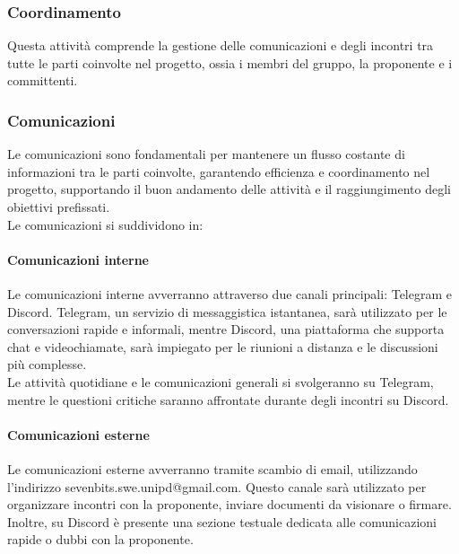 \documentclass[10pt]{article}
\begin{document}
\begin{justify}
    \subsubsection{Coordinamento}
    Questa attività comprende la gestione delle comunicazioni e degli incontri tra tutte le parti coinvolte nel progetto, ossia i  membri del gruppo, la proponente e i committenti.

    \subsubsection{Comunicazioni}
    Le comunicazioni sono fondamentali per mantenere un flusso costante di informazioni tra le parti coinvolte, garantendo efficienza e coordinamento nel progetto, supportando il buon andamento delle attività e il raggiungimento degli obiettivi prefissati.\\
    Le comunicazioni si suddividono in:

        \paragraph{Comunicazioni interne}
        Le comunicazioni interne avverranno attraverso due canali principali: Telegram e Discord. Telegram, un servizio di messaggistica istantanea, sarà utilizzato per le conversazioni rapide e informali, mentre Discord, una piattaforma che supporta chat e videochiamate, sarà impiegato per le riunioni a distanza e le discussioni più complesse.\\
        Le attività quotidiane e le comunicazioni generali si svolgeranno su Telegram, mentre le questioni critiche saranno affrontate durante degli incontri su Discord.

        \paragraph{Comunicazioni esterne}
        Le comunicazioni esterne avverranno tramite scambio di email, utilizzando l'indirizzo sevenbits.swe.unipd@gmail.com. Questo canale sarà utilizzato per organizzare incontri con la proponente, inviare documenti da visionare o firmare. Inoltre, su Discord è presente una sezione testuale dedicata alle comunicazioni rapide o dubbi con la proponente.


\end{justify}
\end{document}
